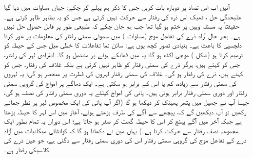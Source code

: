 آئیں اب اس تضاد پر دوبارہ بات کریں جس کا ذکر ہم پہلے کر چکے: جہاں مساوات  میں دیا گیا علیحدگی حل ، ٹھیک اس ذرہ کی رفتار سے حرکت نہیں کرتی ہے جس کو یہ بظاہر ظاہر کرتی ہے۔ حقیقتاً یہ مسئلہ وہیں پر ختم ہو گیا تھا جب ہم جان چکے کہ  طبیعی طور پر قابل حصول حل نہیں ہے۔ بحر حال آزاد ذرے کی تفاعل موج (مساوات ) میں سموئی سمتی رفتار کی معلومات پر غور کرنا دلچسپی کا باعث ہے۔ بنیادی تصور کچھ یوں ہے: سائن نما تفاعلات کا خطی میل جس کے حیطہ کو  ترمیم کرتا ہو (شکل ) موجی اکٹھ ہو گا؛ یہ  میں ڈھانکے ہوئے  پر مشتمل ہو گا۔ انفرادی لہر کی رفتار، جس کو   کہتے ہیں، ہرگز ذرے کی سمتی رفتار کو ظاہر نہیں کرتی ہے بلکہ غلاف کی رفتار، جس کو  کہتے ہیں، ذرے کی رفتار ہو گی۔ غلاف کی سمتی رفتار لہروں کی فطرت پر منحصر ہو گی؛ یہ لہروں کی سمتی رفتار سے زیادہ، کم یا اس کے برابر ہو سکتی ہے۔ ایک دھاگے پر امواج کی گروہی سمتی رفتار اور دوری سمتی رفتار  برابر ہوتی ہیں۔ پانی کی امواج کیلئے یہ دوری سمتی رفتار کی نصف ہو گی، جیسا آپ نے جھیل میں پتھر پھینک کر دیکھا ہو گا (اگر آپ پانی کی ایک مخصوص لہر پر نظر جمائے رکھیں تو آپ دیکھیں گے کہ، پیچھے سے آگے کی طرف بڑھتے ہوئے، آغاز میں اس لہر کا حیطہ بڑھتا ہے جبکہ آخر میں آگے پہنچ کر اس کا حیطہ گھٹ کر صفر ہو جاتا ہے؛ اس دوران یہ تمام بطور ایک مجموعہ نصف رفتار سے حرکت کرتا ہے۔) یہاں میں نے دکھانا ہو گا کہ کوانٹائی میکانیات میں آزاد ذرے کے تفاعل موج کی گروہی سمتی رفتار اس کی دوری سمتی رفتار سے دگنی ہے، جو عین ذرے کی کلاسیکی رفتار ہے۔

